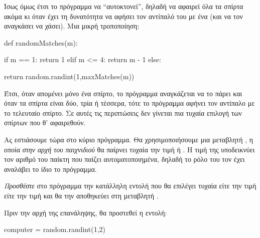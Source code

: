 \documentclass[a4paper,11pt,oneside]{book}
\begin{document}
\begin{step}
\begin{answer}
Ίσως όμως έτσι το πρόγραμμα να ``αυτοκτονεί'', δηλαδή να αφαιρεί όλα τα σπίρτα ακόμα κι όταν έχει τη δυνατότητα να αφήσει τον αντίπαλό του με ένα (και να τον αναγκάσει να χάσει). Μια μικρή τροποποίηση:

\begin{pyplain}
def randomMatches(m):
\end{pyplain}
\begin{pynew}
    if m == 1:
        return 1
    elif m <= 4:
        return m - 1
    else:
\end{pynew}
\begin{pyplain}
        return random.randint(1,maxMatches(m))
\end{pyplain}

Έτσι, όταν απομένει μόνο ένα σπίρτο, το πρόγραμμα αναγκάζεται να το πάρει και όταν τα σπίρτα είναι δύο, τρία ή τέσσερα, τότε το πρόγραμμα αφήνει τον αντίπαλο με το τελευταίο σπίρτο. Σε αυτές τις περιπτώσεις δεν γίνεται πια τυχαία επιλογή των σπίρτων που θ' αφαιρεθούν.
\end{answer}
\end{step}

\begin{step}
Ας εστιάσουμε τώρα στο κύριο πρόγραμμα. Θα χρησιμοποιήσουμε μια μεταβλητή , η οποία \emph{στην αρχή του παιχνιδιού} θα παίρνει τυχαία την τιμή  ή . 
Η τιμή της  υποδεικνύει τον αριθμό του παίκτη που παίζει αυτοματοποιημένα, δηλαδή το ρόλο του τον έχει αναλάβει το ίδιο το πρόγραμμα.

\emph{Προσθέστε} στο πρόγραμμα την κατάλληλη εντολή που θα επιλέγει τυχαία είτε την τιμή  είτε την τιμή  και θα την αποθηκεύει στη μεταβλητή .

\begin{answer}
Πριν την αρχή της επανάληψης, θα προστεθεί η εντολή:

\begin{pynew}
computer = random.randint(1,2)
\end{pynew}
\end{answer}
\end{step}
\end{document}
